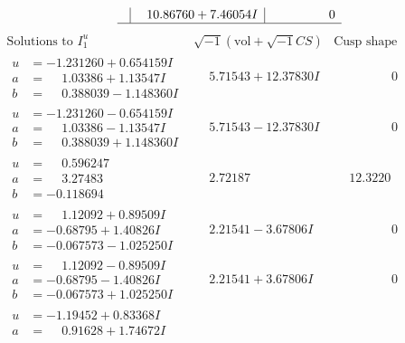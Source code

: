 \documentclass[1p]{elsarticle_modified}
\theoremstyle{definition}
\newcommand{\I}{\sqrt{-1}}
\begin{document}
$$\begin{array}{c|c|c}
 & \phantom{-}10.86760 + 7.46054 I & \phantom{-0.000000 } 0\\
 \hline 
 \end{array}$$\newpage$$\begin{array}{c|c|c}  
\text{Solutions to }I^u_{1}& \I (\text{vol} + \sqrt{-1}CS) & \text{Cusp shape}\\
 \hline 
\begin{aligned}
u &= -1.231260 + 0.654159 I \\
a &= \phantom{-}1.03386 + 1.13547 I \\
b &= \phantom{-}0.388039 - 1.148360 I\end{aligned}
 & \phantom{-}5.71543 + 12.37830 I & \phantom{-0.000000 } 0 \\ \hline\begin{aligned}
u &= -1.231260 - 0.654159 I \\
a &= \phantom{-}1.03386 - 1.13547 I \\
b &= \phantom{-}0.388039 + 1.148360 I\end{aligned}
 & \phantom{-}5.71543 - 12.37830 I & \phantom{-0.000000 } 0 \\ \hline\begin{aligned}
u &= \phantom{-}0.596247\phantom{ +0.000000I} \\
a &= \phantom{-}3.27483\phantom{ +0.000000I} \\
b &= -0.118694\phantom{ +0.000000I}\end{aligned}
 & \phantom{-}2.72187\phantom{ +0.000000I} & \phantom{-}12.3220\phantom{ +0.000000I} \\ \hline\begin{aligned}
u &= \phantom{-}1.12092 + 0.89509 I \\
a &= -0.68795 + 1.40826 I \\
b &= -0.067573 - 1.025250 I\end{aligned}
 & \phantom{-}2.21541 - 3.67806 I & \phantom{-0.000000 } 0 \\ \hline\begin{aligned}
u &= \phantom{-}1.12092 - 0.89509 I \\
a &= -0.68795 - 1.40826 I \\
b &= -0.067573 + 1.025250 I\end{aligned}
 & \phantom{-}2.21541 + 3.67806 I & \phantom{-0.000000 } 0 \\ \hline\begin{aligned}
u &= -1.19452 + 0.83368 I \\
a &= \phantom{-}0.91628 + 1.74672 I \\

\end{aligned}
\end{array}$$
\end{document}
